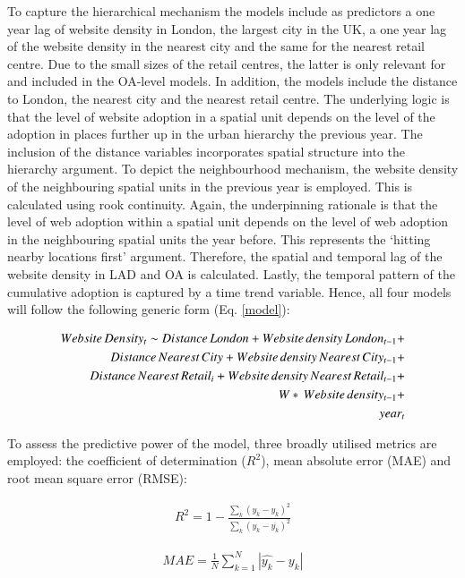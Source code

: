 \documentclass[
  authoryear,
  preprint,
  3p]{elsarticle}
\begin{document}
To capture the hierarchical mechanism the models include as predictors a
one year lag of website density in London, the largest city in the UK, a
one year lag of the website density in the nearest city and the same for
the nearest retail centre. Due to the small sizes of the retail centres,
the latter is only relevant for and included in the OA-level models. In
addition, the models include the distance to London, the nearest city
and the nearest retail centre. The underlying logic is that the level of
website adoption in a spatial unit depends on the level of the adoption
in places further up in the urban hierarchy the previous year. The
inclusion of the distance variables incorporates spatial structure into
the hierarchy argument. To depict the neighbourhood mechanism, the
website density of the neighbouring spatial units in the previous year
is employed. This is calculated using rook continuity. Again, the
underpinning rationale is that the level of web adoption within a
spatial unit depends on the level of web adoption in the neighbouring
spatial units the year before. This represents the `hitting nearby
locations first' argument. Therefore, the spatial and temporal lag of
the website density in LAD and OA is calculated. Lastly, the temporal
pattern of the cumulative adoption is captured by a time trend variable.
Hence, all four models will follow the following generic form (Eq.
\ref{model}):

\begin{align} \label{model}
Website\,Density_{t} \sim Distance\,London +
Website\,density\,London_{t-1} +\notag\\
Distance\,Nearest\,City +
Website\,density\,Nearest\,City_{t-1} +\notag\\
Distance\,Nearest\,Retail_{i} +
Website\,density\,Nearest\,Retail_{t-1} +\notag\\
W*\, Website\,density_{t-1} +\notag\\ 
year_{t}
\end{align}

To assess the predictive power of the model, three broadly utilised
metrics are employed: the coefficient of determination (\(R^2\)), mean
absolute error (MAE) and root mean square error (RMSE):

\begin{align}
R^2 = 1 - \frac{\sum_{k} (y_{k} - \hat{y_{k}})^2} {\sum_{k} (y_{k} - \overline{y_{k}})^2} \label{eq:rsquared}
\end{align}

\begin{align}
MAE = \frac{1}{N} \sum_{k = 1}^{N} |\hat{y_{k}} - y_{k}| \label{eq:mae}
\end{align}
\end{document}
